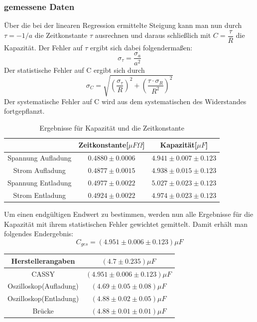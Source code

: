 \documentclass[12pt,a4paper]{article}
\begin{document}
\subsubsection{gemessene Daten}
Über die bei der linearen Regression ermittelte Steigung kann man nun durch $\tau = -1/a$ die Zeitkonstante $\tau$ ausrechnen und daraus schließlich mit $C=\dfrac{\tau}{R}$ die Kapazität.
Der Fehler auf $\tau$ ergibt sich dabei folgendermaßen:
\begin{equation}
\sigma_{\tau}=\dfrac{\sigma_{a}}{a^{2}}
\end{equation}
Der statistische Fehler auf C ergibt sich durch
\begin{equation}
\sigma_C = \sqrt{(\dfrac{\sigma_{\tau}}{R})^{2}+(\dfrac{\tau \cdot \sigma_{R}}{R^{2}})^{2}}
\end{equation}
Der systematische Fehler auf C wird aus dem systematischen des Widerstandes fortgepflanzt.
\begin{table}[H]
\begin{tabular}{|c|c|c|}
\hline 
 & Zeitkonstante[$ \mu F\Omega$] & Kapazität[$ \mu F$] \\ 
\hline 
Spannung Aufladung & $0.4880\pm0.0006$ & $4.941\pm0.007\pm0.123$ \\ 
\hline 
Strom Aufladung & $0.4877\pm0.0015$ & $4.938\pm0.015\pm0.123$ \\ 
\hline 
Spannung Entladung & $0.4977\pm0.0022$ & $5.027\pm0.023\pm0.123$ \\ 
\hline 
Strom Entladung & $0.4924\pm0.0022$ & $4.974\pm0.023\pm0.123$ \\ 
\hline 
\end{tabular}
\caption{Ergebnisse für Kapazität und die Zeitkonstante}
\end{table}

Um einen endgültigen Endwert zu bestimmen, werden nun alle Ergebnisse für die Kapazität mit ihrem statistischen Fehler gewichtet gemittelt. Damit erhält man folgendes Endergebnis:
\begin{equation}
C_{ges} = (4.951\pm 0.006\pm0.123)\mu F
\end{equation}

\begin{tabular}{|c|c|}
\hline 
Herstellerangaben & $(4.7\pm0.235)\mu F$\\ 
\hline 
CASSY & $(4.951\pm 0.006\pm0.123)\mu F$\\
\hline 
Oszilloskop(Aufladung) & $(4.69\pm 0.05\pm 0.08)\mu F$ \\ 
\hline 
Oszilloskop(Entladung) & $(4.88\pm 0.02\pm 0.05)\mu F$ \\ 
\hline 
Brücke & $(4.88\pm0.01\pm0.01)\mu F$ \\ 
\hline 
\end{tabular} 
\end{document}
